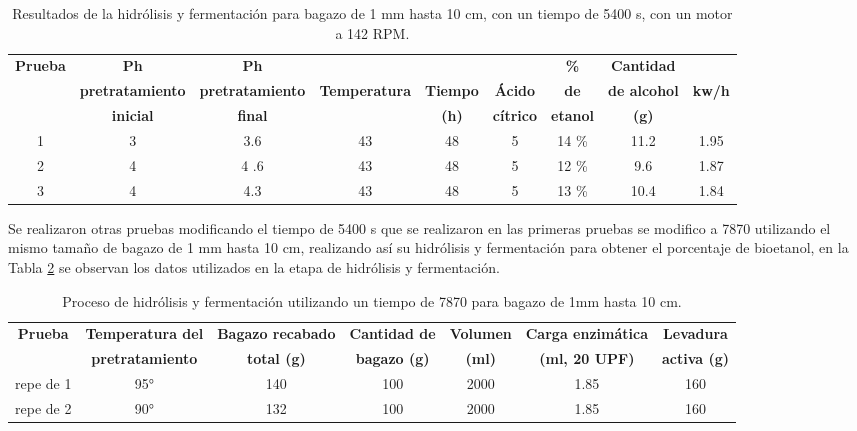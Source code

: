 \documentclass[12pt]{article}
\begin{document}
	
	
	\begin{table}[h!]
		\centering
		\caption{Resultados de la hidrólisis y fermentación para bagazo de 1 mm hasta 10 cm, con un tiempo de 5400 s, con un motor a 142 RPM.}
		\label{hidrolisis alcalino varios_parte2}
		\resizebox{16cm}{!} {
			\begin{tabular}{|c|c|c|c|c|c|c|c|c|}
				\hline
				\textbf{Prueba}	& \textbf{Ph}& \textbf{Ph} &  &  &  &\textbf{\%} & \textbf{Cantidad} & \\
				&	\textbf{pretratamiento} & 	\textbf{pretratamiento} & \textbf{Temperatura} & \textbf{Tiempo} & \textbf{Ácido} & \textbf{de } & \textbf{de alcohol } & \textbf{kw/h} \\
				&	\textbf{inicial}& \textbf{final} &  &\textbf{(h)}  & \textbf{cítrico} & \textbf{etanol }& \textbf{(g) }& \\ \hline		
				1	    &3  & 3.6 & 43& 48 & 5 & 14 \% &11.2 & 1.95\\ \hline
				
				2   	&4  &4 .6 & 43& 48 & 5 & 12 \%  &9.6 &1.87  \\ \hline
				
				3	&4  & 4.3 & 43 & 48 & 5 & 13 \%  &10.4& 1.84\\ \hline
				
		\end{tabular} }
		
	\end{table}
	
	
	
	
	Se realizaron otras pruebas modificando el tiempo de 5400 s que se realizaron en las primeras pruebas se modifico a 7870 utilizando el mismo tamaño de bagazo de 1 mm hasta 10 cm, realizando así su hidrólisis y fermentación para obtener el porcentaje de bioetanol, en la Tabla \ref{hidrolisis alcalino varios_7870}  se observan los datos utilizados en la etapa de hidrólisis y fermentación.
	
		\begin{table}[H]
		\centering
		\caption{Proceso de hidrólisis y fermentación utilizando un tiempo de 7870 para bagazo de 1mm hasta 10 cm.}
		\label{hidrolisis alcalino varios_7870}
		\resizebox{16cm}{!} {
			\begin{tabular}{|c|c|c|c|c|c|c|}
				\hline
				\textbf{Prueba}	& \textbf{Temperatura del} & \textbf{Bagazo recabado} & \textbf{Cantidad de} & \textbf{Volumen} & \textbf{Carga enzimática} & \textbf{Levadura} \\
				&	\textbf{pretratamiento} & \textbf{total (g)} & \textbf{bagazo (g)} & \textbf{(ml)} & \textbf{(ml, 20 UPF)} & \textbf{activa (g)} \\ \hline		

				repe de 1&	95° & 140 & 100 & 2000 & 1.85 & 160 \\ \hline

				repe de 2	&	90° & 132 & 100 & 2000 & 1.85 & 160 \\ \hline

				
		\end{tabular} }
		
	\end{table}
	
\end{document}
